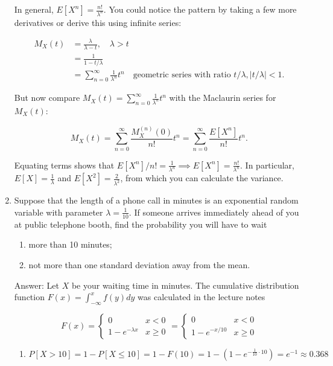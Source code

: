 \documentclass{article}
\begin{document}
\begin{enumerate}
In general, $E[X^n] = \frac{n!}{\lambda^n}$. You could notice the pattern by taking a few more derivatives or derive this using infinite series:

\begin{align*}
M_X(t) &= \frac{\lambda}{\lambda - t}, \quad \lambda > t\\
&= \frac{1}{1-t/\lambda} \\
&= \sum_{n=0}^\infty \frac{1}{\lambda^n}t^n \quad \text{geometric series with ratio } t/\lambda, |t/\lambda|<1.
\end{align*}

But now compare $M_X(t) = \sum_{n=0}^\infty \frac{1}{\lambda^n}t^n$  with the Maclaurin series for $M_X(t)$:

$$
M_X(t) = \sum_{n=0}^\infty \frac{M_X^{(n)}(0)}{n!}t^n = \sum_{n=0}^\infty \frac{E[X^n]}{n!}t^n .
$$

Equating terms shows that $E[X^n] / n! = \frac{1}{\lambda^n} \implies E[X^n] = \frac{n!}{\lambda^n}$. In particular, $E[X] = \frac{1}{\lambda}$ and $E[X^2] = \frac{2}{\lambda^2}$, from which you can calculate the variance. 

\newpage
\item

Suppose that the length of a phone call in minutes is an exponential random variable with parameter $\lambda = \frac{1}{10}$. If someone arrives immediately ahead of you at public telephone booth, find the probability you will have to wait

\begin{enumerate}
\item more than 10 minutes;

\item not more than one standard deviation away from the mean. 

\end{enumerate}

Answer: Let $X$ be your waiting time in minutes. The cumulative distribution function $F(x) = \int_{-\infty}^x f(y) dy$ was calculated in the lecture notes

$$
F(x) = 
\begin{cases}
0 & x < 0 \\ 1- e^{-\lambda x} & x \geq 0
\end{cases}
= 
\begin{cases}
0 & x < 0 \\ 1- e^{-x/10} & x \geq 0
\end{cases}
$$

\begin{enumerate}
\item $P[X > 10] = 1-P[X \leq 10] = 1- F(10) = 1-(1-e^{-\frac{1}{10}\cdot 10}) = e^{-1} \approx 0.368$


\end{enumerate}
\end{enumerate}
\end{document}
